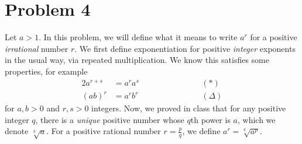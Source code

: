 \documentclass[11pt]{article}
\begin{document}
\pagebreak
\section{Problem 4}
    Let $a > 1$. In this problem, we will define what it means to write $a^r$ for a positive \textit{irrational} number $r$. We first define exponentiation for positive \textit{integer} exponents in the usual way, via repeated multiplication. We know this satisfies some properties, for example
    \begin{alignat*}{2}
        a^{r + s} &= a^r a^s \qquad \qquad \qquad &&(\ast)\\[5pt]
        (ab)^{r} &= a^r b^r \qquad \qquad \qquad &&(\Delta)
    \end{alignat*}
    for $a, b > 0$ and $r, s > 0$ integers. Now, we proved in class that for any positive integer $q$, there is a \textit{unique} positive number whose $q$th power is $a$, which we denote $\sqrt[q]{a}$. For a positive rational number $r = \frac{p}{q}$, we define $a^r = \sqrt[q]{a^p}$.
\end{document}
